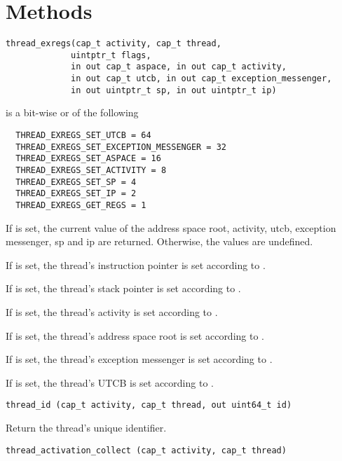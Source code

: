 \section{Methods}

\begin{lstlisting}
thread_exregs(cap_t activity, cap_t thread,
             uintptr_t flags,
             in out cap_t aspace, in out cap_t activity,
             in out cap_t utcb, in out cap_t exception_messenger,
             in out uintptr_t sp, in out uintptr_t ip)
\end{lstlisting}

 is a bit-wise or of the following

\begin{lstlisting}
  THREAD_EXREGS_SET_UTCB = 64
  THREAD_EXREGS_SET_EXCEPTION_MESSENGER = 32
  THREAD_EXREGS_SET_ASPACE = 16
  THREAD_EXREGS_SET_ACTIVITY = 8
  THREAD_EXREGS_SET_SP = 4
  THREAD_EXREGS_SET_IP = 2
  THREAD_EXREGS_GET_REGS = 1
\end{lstlisting}

If  is set, the current value of the
address space root, activity, utcb, exception messenger, sp and ip are
returned.  Otherwise, the values are undefined.

If  is set, the thread's instruction
pointer is set according to .

If  is set, the thread's stack pointer
is set according to .

If  is set, the thread's activity
is set according to .

If  is set, the thread's address
space root is set according to .

If  is set, the
thread's exception messenger is set according to
.

If  is set, the thread's UTCB is set
according to .

\begin{lstlisting}
thread_id (cap_t activity, cap_t thread, out uint64_t id)
\end{lstlisting}

Return the thread's unique identifier.

\begin{lstlisting}
thread_activation_collect (cap_t activity, cap_t thread)
\end{lstlisting}

